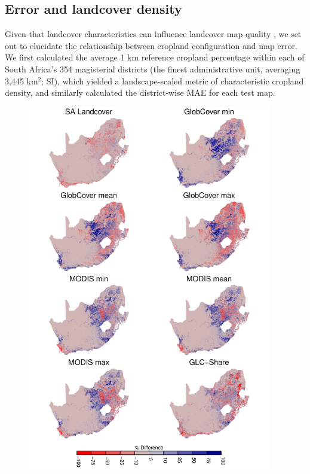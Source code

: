 \documentclass{pnastwo2}
\begin{document}
\begin{article}
\subsection{Error and landcover density}
Given that landcover characteristics can influence landcover map quality \cite{see_improved_2015, estes_platform_2015, debats_generalized_2015}, we set out to elucidate the relationship between cropland configuration and map error.  We first calculated the average 1 km reference cropland percentage within each of South Africa's 354 magisterial districts (the finest administrative unit, averaging 3,445 km$^2$; SI), which yielded a landscape-scaled metric of characteristic cropland density, and similarly calculated the district-wise MAE for each test map. 

\begin{figure}[hb]
\centerline{\includegraphics[width=0.95\textwidth]{figures/figure1.pdf}}

\end{figure}
\end{article}
\end{document}
